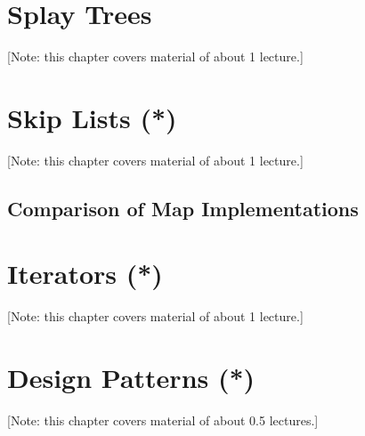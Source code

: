 \documentclass{book}
\begin{document}
%

\chapter{Splay Trees}
\label{chap:splay-trees}
[Note: this chapter covers material of about 1 lecture.]

%

\chapter{Skip Lists (*)}
\label{chap:skip-lists}
[Note: this chapter covers material of about 1 lecture.]

%

\section{Comparison of Map Implementations}
\label{sec:map-comparison}

%

\chapter{Iterators (*)}
\label{chap:iterators}
[Note: this chapter covers material of about 1 lecture.]

%

\chapter{Design Patterns (*)}
\label{chap:design-patterns}
[Note: this chapter covers material of about 0.5 lectures.]

%

\end{document}
